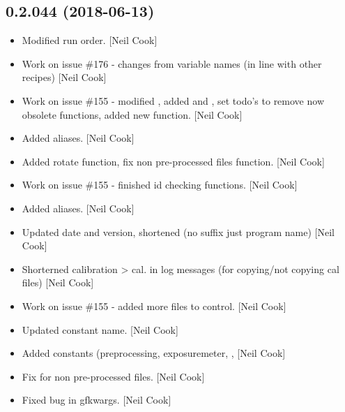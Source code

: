 \documentclass[a4paper,10pt,english]{report}
\begin{document}
\subsection{0.2.044 (2018-06-13)}
\label{\detokenize{misc/changelog:id421}}\begin{itemize}
\item {} 
Modified run order. {[}Neil Cook{]}

\item {} 
Work on issue \#176 - changes from variable names (in line with other
recipes) {[}Neil Cook{]}

\item {} 
Work on issue \#155 - modified , added
 and , set todo’s to remove now
obsolete functions, added new  function. {[}Neil Cook{]}

\item {} 
Added aliases. {[}Neil Cook{]}

\item {} 
Added rotate function, fix non pre-processed files function. {[}Neil
Cook{]}

\item {} 
Work on issue \#155 - finished id checking functions. {[}Neil Cook{]}

\item {} 
Added aliases. {[}Neil Cook{]}

\item {} 
Updated date and version, shortened  (no suffix just program
name) {[}Neil Cook{]}

\item {} 
Shorterned calibration \textendash{}\textgreater{} cal. in log messages (for copying/not
copying cal files) {[}Neil Cook{]}

\item {} 
Work on issue \#155 - added more files to control. {[}Neil Cook{]}

\item {} 
Updated constant name. {[}Neil Cook{]}

\item {} 
Added constants (preprocessing, exposuremeter, ,  {[}Neil
Cook{]}

\item {} 
Fix for non pre-processed files. {[}Neil Cook{]}

\item {} 
Fixed bug in gfkwargs. {[}Neil Cook{]}


\end{itemize}
\end{document}
